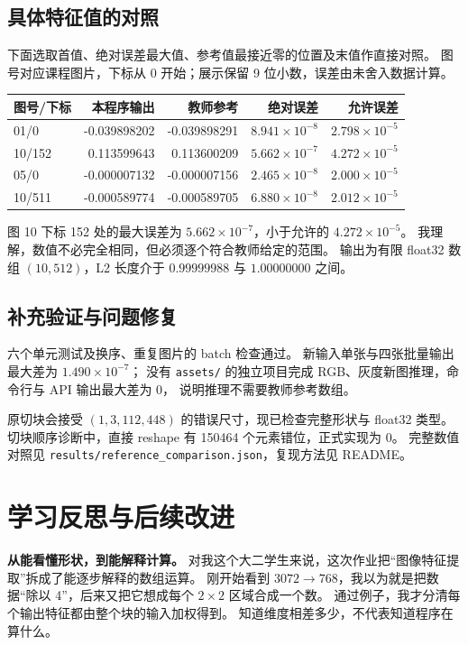 \documentclass[a4paper,12pt]{article}
\begin{document}
\subsection{具体特征值的对照}
下面选取首值、绝对误差最大值、参考值最接近零的位置及末值作直接对照。
图号对应课程图片，下标从 0 开始；展示保留 9 位小数，误差由未舍入数据计算。
\begin{center}
\small
\setlength{\tabcolsep}{3pt}
\begin{tabular}{@{}lrrrr@{}}
\toprule
图号/下标 & 本程序输出 & 教师参考 & 绝对误差 & 允许误差\\
\midrule
01/0 & -0.039898202 & -0.039898291 & $8.941\times10^{-8}$ & $2.798\times10^{-5}$\\
10/152 & 0.113599643 & 0.113600209 & $5.662\times10^{-7}$ & $4.272\times10^{-5}$\\
05/0 & -0.000007132 & -0.000007156 & $2.465\times10^{-8}$ & $2.000\times10^{-5}$\\
10/511 & -0.000589774 & -0.000589705 & $6.880\times10^{-8}$ & $2.012\times10^{-5}$\\
\bottomrule
\end{tabular}
\end{center}
图 10 下标 152 处的最大误差为 $5.662\times10^{-7}$，小于允许的 $4.272\times10^{-5}$。
我理解，数值不必完全相同，但必须逐个符合教师给定的范围。
输出为有限 float32 数组 $(10,512)$，L2 长度介于 $0.99999988$ 与 $1.00000000$ 之间。

\subsection{补充验证与问题修复}
六个单元测试及换序、重复图片的 batch 检查通过。
新输入单张与四张批量输出最大差为 $1.490\times10^{-7}$；
没有 \texttt{assets/} 的独立项目完成 RGB、灰度新图推理，命令行与 API 输出最大差为 0，
说明推理不需要教师参考数组。

原切块会接受 $(1,3,112,448)$ 的错误尺寸，现已检查完整形状与 float32 类型。
切块顺序诊断中，直接 reshape 有 150464 个元素错位，正式实现为 0。
完整数值对照见 \texttt{results/reference\_comparison.json}，复现方法见 README。

\clearpage

\section{学习反思与后续改进}
\noindent\textbf{从能看懂形状，到能解释计算。}
对我这个大二学生来说，这次作业把“图像特征提取”拆成了能逐步解释的数组运算。
刚开始看到 $3072\to768$，我以为就是把数据“除以 4”，后来又把它想成每个 $2\times2$ 区域合成一个数。
通过例子，我才分清每个输出特征都由整个块的输入加权得到。
知道维度相差多少，不代表知道程序在算什么。
\end{document}
